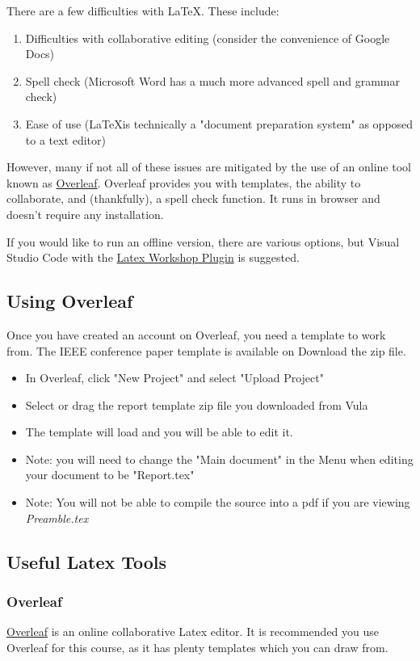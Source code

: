 There are a few difficulties with \LaTeX. These include:
\begin{enumerate}
    \item Difficulties with collaborative editing (consider the convenience of Google Docs)
    \item Spell check (Microsoft Word has a much more advanced spell and grammar check)
    \item Ease of use (\LaTeX is technically a "document preparation system" as opposed to a text editor)
\end{enumerate}

However, many if not all of these issues are mitigated by the use of an online tool known as \href{https://www.overleaf.com}{Overleaf}. Overleaf provides you with templates, the ability to collaborate, and (thankfully), a spell check function. It runs in browser and doesn't require any installation. 

If you would like to run an offline version, there are various options, but Visual Studio Code with the \href{https://github.com/James-Yu/LaTeX-Workshop/wiki/Install}{Latex Workshop Plugin} is suggested.

\subsection{Using Overleaf}
Once you have created an account on Overleaf, you need a template to work from. The IEEE conference paper template is available on Download the zip file. 
\begin{itemize}
    \item In Overleaf, click "New Project" and select "Upload Project"
    \item Select or drag the report template zip file you downloaded from Vula
    \item The template will load and you will be able to edit it.
    \item Note: you will need to change the "Main document" in the Menu when editing your document to be "Report.tex"
    \item Note: You will not be able to compile the source into a pdf if you are viewing \textit{Preamble.tex}
\end{itemize}

\subsection{Useful Latex Tools}
\subsubsection{Overleaf}
\href{https://www.overleaf.com}{Overleaf} is an online collaborative Latex editor. It is recommended you use Overleaf for this course, as it has plenty templates which you can draw from. 

